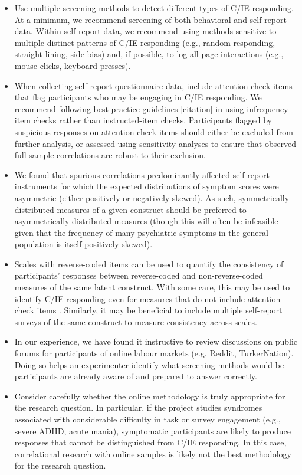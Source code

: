 \documentclass[a4paper,notitlepage,12pt]{article}
\begin{document}
\begin{itemize}

    \item Use multiple screening methods to detect different types of C/IE responding. At a minimum, we recommend screening of both behavioral and self-report data. Within self-report data, we recommend using methods sensitive to multiple distinct patterns of C/IE responding (e.g., random responding, straight-lining, side bias) and, if possible, to log all page interactions (e.g., mouse clicks, keyboard presses).

    \item When collecting self-report questionnaire data, include attention-check items that flag participants who may be engaging in C/IE responding. We recommend following best-practice guidelines [citation] in using infrequency-item checks rather than instructed-item checks. Participants flagged by suspicious responses on attention-check items should either be excluded from further analysis, or assessed using sensitivity analyses to ensure that observed full-sample correlations are robust to their exclusion.

    \item We found that spurious correlations predominantly affected self-report instruments for which the expected distributions of symptom scores were asymmetric (either positively or negatively skewed). As such, symmetrically-distributed measures of a given construct should be preferred to asymmetrically-distributed measures (though this will often be infeasible given that the frequency of many psychiatric symptoms in the general population is itself positively skewed).
    
    \item Scales with reverse-coded items can be used to quantify the consistency of participants' responses between reverse-coded and non-reverse-coded measures of the same latent construct. With some care, this may be used to identify C/IE responding even for measures that do not include attention-check items \cite{emons2009detection}. Similarly, it may be beneficial to include multiple self-report surveys of the same construct to measure consistency across scales.
    
    \item In our experience, we have found it instructive to review discussions on public forums for participants of online labour markets (e.g. Reddit, TurkerNation). Doing so helps an experimenter identify what screening methods would-be participants are already aware of and prepared to answer correctly.
    
    \item Consider carefully whether the online methodology is truly appropriate for the research question. In particular, if the project studies syndromes associated with considerable difficulty in task or survey engagement (e.g., severe ADHD, acute mania), symptomatic participants are likely to produce responses that cannot be distinguished from C/IE responding. In this case, correlational research with online samples is likely not the best methodology for the research question.

\end{itemize}
\end{document}

